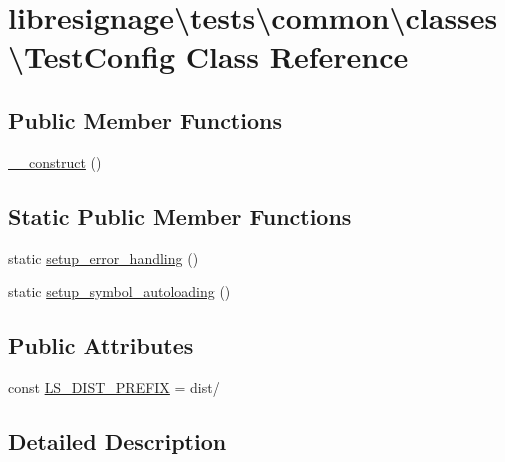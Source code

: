 \hypertarget{classlibresignage_1_1tests_1_1common_1_1classes_1_1TestConfig}{}\section{libresignage\textbackslash{}tests\textbackslash{}common\textbackslash{}classes\textbackslash{}Test\+Config Class Reference}
\label{classlibresignage_1_1tests_1_1common_1_1classes_1_1TestConfig}
\subsection*{Public Member Functions}
\begin{DoxyCompactItemize}
\item 
\hyperlink{classlibresignage_1_1tests_1_1common_1_1classes_1_1TestConfig_a8e9b224aca7cf24d1281f2fb28a52c09}{\+\_\+\+\_\+construct} ()
\end{DoxyCompactItemize}
\subsection*{Static Public Member Functions}
\begin{DoxyCompactItemize}
\item 
static \hyperlink{classlibresignage_1_1tests_1_1common_1_1classes_1_1TestConfig_a88899d3c0df463f1d231432ac186bcaf}{setup\+\_\+error\+\_\+handling} ()
\item 
static \hyperlink{classlibresignage_1_1tests_1_1common_1_1classes_1_1TestConfig_abdb579b4e79b9d7bcd229c93aaa1d99c}{setup\+\_\+symbol\+\_\+autoloading} ()
\end{DoxyCompactItemize}
\subsection*{Public Attributes}
\begin{DoxyCompactItemize}
\item 
const \hyperlink{classlibresignage_1_1tests_1_1common_1_1classes_1_1TestConfig_a0f9a34c0f7f75ac2174a6eaf6c2f417d}{L\+S\+\_\+\+D\+I\+S\+T\+\_\+\+P\+R\+E\+F\+IX} = \textquotesingle{}dist/\textquotesingle{}
\end{DoxyCompactItemize}


\subsection{Detailed Description}


